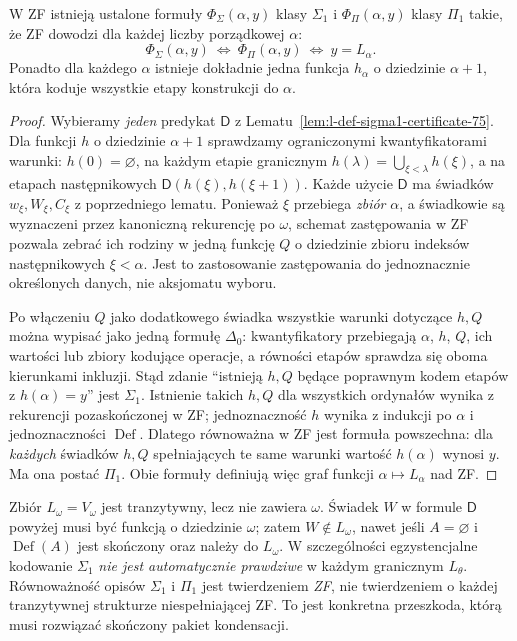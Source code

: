 \begin{lemat}
\label{lem:l-hierarchy-delta1-derived-75}
W ZF istnieją ustalone formuły
$\Phi_{\Sigma}(\alpha,y)$ klasy $\Sigma_1$ i
$\Phi_{\Pi}(\alpha,y)$ klasy $\Pi_1$ takie, że
ZF dowodzi dla każdej liczby porządkowej $\alpha$:
\[
\Phi_{\Sigma}(\alpha,y)
\ \Longleftrightarrow\
\Phi_{\Pi}(\alpha,y)
\ \Longleftrightarrow\ y=L_\alpha.
\]
Ponadto dla każdego $\alpha$ istnieje dokładnie
jedna funkcja $h_\alpha$ o dziedzinie $\alpha+1$,
która koduje wszystkie etapy konstrukcji do $\alpha$.
\end{lemat}
\begin{proof}
Wybieramy \emph{jeden} predykat $\mathsf D$ z
Lematu~\ref{lem:l-def-sigma1-certificate-75}.
Dla funkcji $h$ o dziedzinie $\alpha+1$
sprawdzamy ograniczonymi kwantyfikatorami warunki:
$h(0)=\varnothing$, na każdym etapie granicznym
$h(\lambda)=\bigcup_{\xi<\lambda}h(\xi)$,
a na etapach następnikowych
$\mathsf D(h(\xi),h(\xi+1))$.
Każde użycie $\mathsf D$ ma świadków $w_\xi,W_\xi,C_\xi$
z poprzedniego lematu.
Ponieważ $\xi$ przebiega \emph{zbiór} $\alpha$,
a świadkowie są wyznaczeni przez kanoniczną rekurencję
po $\omega$, schemat zastępowania w ZF pozwala
zebrać ich rodziny w jedną funkcję $Q$ o dziedzinie
zbioru indeksów następnikowych $\xi<\alpha$.
Jest to zastosowanie zastępowania do
jednoznacznie określonych danych, nie aksjomatu wyboru.

Po włączeniu $Q$ jako dodatkowego świadka wszystkie
warunki dotyczące $h,Q$ można wypisać jako jedną
formułę $\Delta_0$: kwantyfikatory przebiegają
$\alpha$, $h$, $Q$, ich wartości lub zbiory kodujące
operacje, a równości etapów sprawdza się oboma
kierunkami inkluzji. Stąd zdanie
``istnieją $h,Q$ będące poprawnym kodem etapów
z $h(\alpha)=y$'' jest $\Sigma_1$.
Istnienie takich $h,Q$ dla wszystkich ordynałów
wynika z rekurencji pozaskończonej w ZF; jednoznaczność
$h$ wynika z indukcji po $\alpha$ i jednoznaczności
$\operatorname{Def}$. Dlatego równoważna w ZF jest
formuła powszechna: dla \emph{każdych} świadków
$h,Q$ spełniających te same warunki wartość
$h(\alpha)$ wynosi $y$. Ma ona postać $\Pi_1$.
Obie formuły definiują więc graf funkcji
$\alpha\mapsto L_\alpha$ nad ZF.
\end{proof}

\begin{przyklad}
\label{ex:l-delta1-not-arbitrary-level-75}
Zbiór $L_\omega=V_\omega$ jest tranzytywny, lecz
nie zawiera $\omega$. Świadek $W$ w formule
$\mathsf D$ powyżej musi być funkcją o dziedzinie
$\omega$; zatem $W\notin L_\omega$, nawet jeśli
$A=\varnothing$ i $\operatorname{Def}(A)$ jest
skończony oraz należy do $L_\omega$.
W szczególności egzystencjalne kodowanie
$\Sigma_1$ \emph{nie jest automatycznie prawdziwe}
w każdym granicznym $L_\theta$.
Równoważność opisów $\Sigma_1$ i $\Pi_1$ jest
twierdzeniem \emph{ZF}, nie twierdzeniem o każdej
tranzytywnej strukturze niespełniającej ZF.
To jest konkretna przeszkoda, którą musi rozwiązać
skończony pakiet kondensacji.
\end{przyklad}

